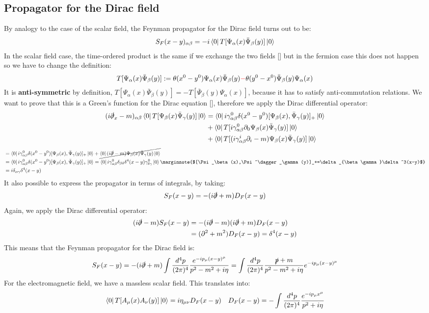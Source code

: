 \documentclass[../main.tex]{subfiles}
\begin{document}
\subsection{Propagator for the Dirac field}
By analogy to the case of the scalar field, the Feynman propagator for the Dirac field turns out to be:
\[
S_F(x-y)_{\alpha\beta}=-i\bra{0}T[\Psi_\alpha(x)\bar{\Psi}_\beta(y)]\ket{0}
\]
In the scalar field case, the time-ordered product is the same if we exchange the two fields [] but in the fermion case this does not happen so we have to change the definition:
\[
T[\Psi_\alpha(x)\bar{\Psi}_\beta(y)]:=\theta(x^0-y^0)\Psi_\alpha(x)\bar{\Psi}_\beta(y){\color{red}-}\theta(y^0-x^0)\bar{\Psi}_\beta(y)\Psi_\alpha(x)
\]
It is \textbf{anti-symmetric} by definition, $T[\Psi_\alpha(x)\bar{\Psi}_\beta(y)]=-T[\bar{\Psi}_\beta(y)\Psi_\alpha(x)]$, because it has to satisfy anti-commutation relations. We want to prove that this is a Green's function for the Dirac equation [], therefore we apply the Dirac differential operator:
\begin{align*}
(i\slashed{\partial}_x-m)_{\alpha\beta}\bra{0}T[\Psi_\beta(x)\bar{\Psi}_\gamma(y)]\ket{0}&=\bra{0}i\gamma_{\alpha\beta}^0\delta(x^0-y^0)[\Psi_\beta(x),\bar{\Psi}_\gamma(y)]_+\ket{0}\\
&+\bra{0}T[i\gamma^0_{\alpha\beta}\partial_0\Psi_\beta(x)\bar{\Psi}_\gamma(y)]\ket{0}\\
&+\bra{0}T[(i\gamma^i_{\alpha\beta}\partial_i-m)\Psi_\beta(x)\bar{\Psi}_\gamma(y)]\ket{0}
\end{align*}
\begin{align*}
&=\bra{0}i\gamma_{\alpha\beta}^0\delta(x^0-y^0)[\Psi_\beta(x),\bar{\Psi}_\gamma(y)]_+\ket{0}+\cancel{\bra{0}(i\slashed{\partial}-m)\Psi_\beta(x)\bar{\Psi}_\gamma(y)\ket{0}}\\
&=\bra{0}i\gamma_{\alpha\beta}^0\delta(x^0-y^0)[\Psi_\beta(x),\bar{\Psi}_\gamma(y)]_+\ket{0}=\bra{0}i\gamma^0_{\alpha\beta}\delta_{\beta\delta}\delta^4(x-y)\gamma^0_{\delta\gamma}\ket{0}\marginnote{$[\Psi_\beta(x),\Psi^\dagger_\gamma(y)]_+=\delta_{\beta\gamma}\delta^3(x-y)$}\\
&=i\delta_{\alpha\gamma}\delta^4(x-y)
\end{align*}
It also possible to express the propagator in terms of integrals, by taking:
\[
S_F(x-y)=-(i\slashed{\partial}+m)D_F(x-y)
\]
Again, we apply the Dirac differential operator:
\begin{align*}
(i\slashed{\partial}-m)S_F(x-y)&=-(i\slashed{\partial}-m)(i\slashed{\partial}+m)D_F(x-y)\\
&=(\partial^2+m^2)D_F(x-y)=\delta^4(x-y)
\end{align*}
This means that the Feynman propagator for the Dirac field is:
\[
S_F(x-y)=-(i\slashed{\partial}+m)\int\frac{d^4p}{(2\pi)^4}\frac{e^{-ip_\mu(x-y)^\mu}}{p^2-m^2+i\eta}=\int\frac{d^4p}{(2\pi)^4}\frac{\slashed{p}+m}{p^2-m^2+i\eta}e^{-ip_\mu(x-y)^\mu}
\]
For the electromagnetic field, we have a massless scalar field. This translates into:
\[
\bra{0}T[A_\mu(x)A_\nu(y)]\ket{0}=i\eta_{\mu\nu}D_F(x-y) \quad D_F(x-y)=-\int\frac{d^4p}{(2\pi)^4}\frac{e^{-ip_\mu x^\mu}}{p^2+i\eta}
\]
\end{document}
